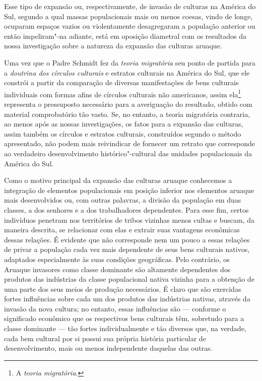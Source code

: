 Esse tipo de expansão ou, respectivamente, de invasão de culturas na
América do Sul, segundo a qual massas populacionais mais ou menos
coesas, vindo de longe, ocuparam espaços vazios ou violentamente
desagregaram a população anterior ou então impeliram"-na adiante, está em
oposição diametral com os resultados da nossa investigação sobre a
natureza da expansão das culturas aruaque.

Uma vez que o Padre Schmidt fez da \textit{teoria migratória} seu ponto de
partida para a \textit{doutrina dos círculos culturais} e estratos culturais na
América do Sul, que ele constrói a partir da comparação de diversas
manifestações de bens culturais individuais com formas afins de
círculos culturais não americanos, assim ela\footnote{A \textit{teoria migratória}.}
representa o pressuposto necessário para a averiguação do resultado,
obtido com material comprobatório tão vasto. Se, no entanto, a teoria
migratória contraria, ao menos após as nossas investigações, os fatos
para a expansão das culturas, assim também os círculos e
estratos culturais, construídos segundo o método apresentado, não podem
mais reivindicar de fornecer um retrato que corresponde ao verdadeiro
desenvolvimento histórico"-cultural das unidades populacionais da América
do Sul.

Como o motivo principal da expansão das culturas aruaque conhecemos a
integração de elementos populacionais em posição inferior nos elementos
aruaque mais desenvolvidos ou, com outras palavras, a divisão da
população em duas classes, a dos senhores e a dos trabalhadores
dependentes. Para esse fim, certos indivíduos penetram nos territórios
de tribos vizinhas menos cultas e buscam, da maneira descrita, se
relacionar com elas e extrair suas vantagens econômicas dessas relações.
É evidente que não corresponde nem um pouco a essas relações de privar
a população cada vez mais dependente de seus bens culturais nativos,
adaptados especialmente às suas condições geográficas. Pelo contrário,
os Aruaque invasores como classe dominante são altamente dependentes
dos produtos das indústrias da classe populacional nativa vizinha para
a obtenção de uma parte dos seus meios de produção necessários. É claro
que são exercidas fortes influências sobre cada um dos produtos das
indústrias nativas, através da invasão da nova cultura; no entanto,
essas influências são --- conforme o significado econômico que os
respectivos bens culturais têm, sobretudo para a classe dominante --- tão
fortes individualmente e tão diversos que, na verdade, cada bem cultural
por si possui sua própria história particular de desenvolvimento, mais
ou menos independente daquelas das outras.

